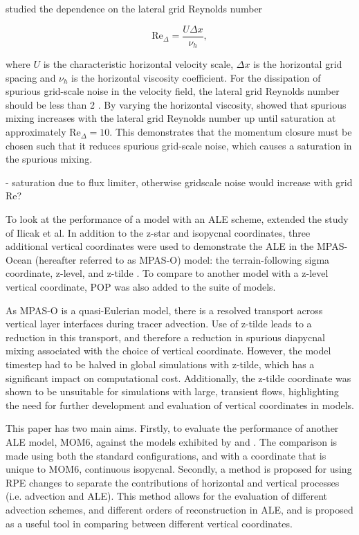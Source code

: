 \citet{ilicak12} studied the dependence on the lateral grid Reynolds number

$$\mathrm{Re}_\Delta = \frac{U\Delta x}{\nu_h},$$

where $U$ is the characteristic horizontal velocity scale, $\Delta x$ is the horizontal grid spacing and $\nu_h$ is the horizontal viscosity coefficient. For the dissipation of spurious grid-scale noise in the velocity field, the lateral grid Reynolds number should be less than 2 \citep[p.~410]{griffies04}. By varying the horizontal viscosity, \citet{ilicak12} showed that spurious mixing increases with the lateral grid Reynolds number up until saturation at approximately $\mathrm{Re}_\Delta = 10$. This demonstrates that the momentum closure must be chosen such that it reduces spurious grid-scale noise, which causes a saturation in the spurious mixing.

- saturation due to flux limiter, otherwise gridscale noise would increase with grid Re?

To look at the performance of a model with an ALE scheme, \citet{petersen15} extended the study of Ilicak et al. In addition to the z-star and isopycnal coordinates, three additional vertical coordinates were used to demonstrate the ALE in the MPAS-Ocean (hereafter referred to as MPAS-O) model: the terrain-following sigma coordinate, z-level, and z-tilde \citep{leclair11}. To compare to another model with a z-level vertical coordinate, POP was also added to the suite of models.

As MPAS-O is a quasi-Eulerian model, there is a resolved transport across vertical layer interfaces during tracer advection. Use of z-tilde leads to a reduction in this transport, and therefore a reduction in spurious diapycnal mixing associated with the choice of vertical coordinate. However, the model timestep had to be halved in global simulations with z-tilde, which has a significant impact on computational cost. Additionally, the z-tilde coordinate was shown to be unsuitable for simulations with large, transient flows, highlighting the need for further development and evaluation of vertical coordinates in models.

This paper has two main aims. Firstly, to evaluate the performance of another ALE model, MOM6, against the models exhibited by \citet{ilicak12} and \citet{petersen15}. The comparison is made using both the standard configurations, and with a coordinate that is unique to MOM6, continuous isopycnal. Secondly, a method is proposed for using RPE changes to separate the contributions of horizontal and vertical processes (i.e. advection and ALE). This method allows for the evaluation of different advection schemes, and different orders of reconstruction in ALE, and is proposed as a useful tool in comparing between different vertical coordinates.
